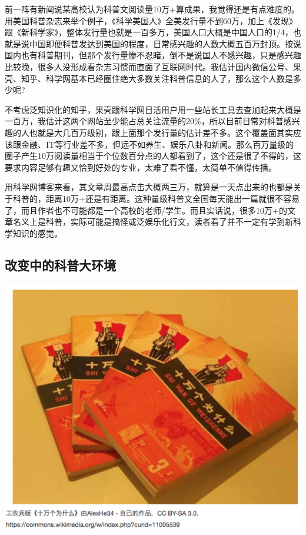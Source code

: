 \documentclass[]{book}
\begin{document}
前一阵有新闻说某高校认为科普文阅读量10万+算成果，我觉得还是有点难度的。用美国科普杂志来举个例子，《科学美国人》全美发行量不到60万，加上《发现》跟《新科学家》，整体发行量也就是一百多万，美国人口大概是中国人口的1/4，也就是说中国即便科普发达到美国的程度，日常感兴趣的人数大概五百万封顶。按说国内也有科普期刊，但那个发行量惨不忍睹，倒不是说国人不感兴趣，只是感兴趣比较晚，很多人没形成看杂志习惯而直面了互联网时代。我估计国内微信公号、果壳、知乎、科学网基本已经圈住绝大多数关注科普信息的人了，那么这个人数是多少呢?

不考虑泛知识化的知乎，果壳跟科学网日活用户用一些站长工具去查加起来大概是一百万，我估计这两个网站至少能占总关注流量的20\%，所以目前日常对科普感兴趣的人也就是大几百万级别，跟上面那个发行量的估计差不多。这个覆盖面其实应该跟金融、IT等行业差不多，但远不如养生、娱乐八卦和新闻。那么百万量级的圈子产生10万阅读量相当于个位数百分点的人都看到了，这个还是很了不得的，这要求内容足够有趣又恰到好处的专业，太难了看不懂，太简单不值得传播。

用科学网博客来看，其文章周最高点击大概两三万，就算是一天点出来的也都是关于科普的，距离10万+还是有距离。这种量级科普文全国每天能出一篇就很不容易了，而且作者也不可能都是一个高校的老师/学生。而且实话说，很多10万+的文章名义上是科普，实际可能是搞怪或泛娱乐化行文，读者看了并不一定有学到新科学知识的感觉。

\subsection{改变中的科普大环境}

\includegraphics[width=8.33in]{images/pops2}
\end{document}
